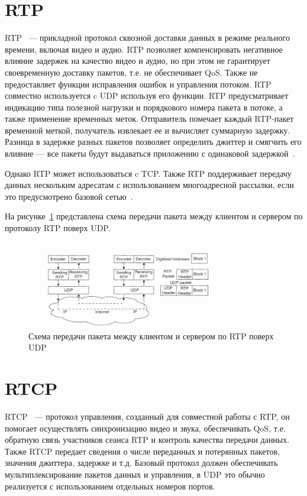 \section{RTP}

RTP~\cite{rtp_rtcp_overview} --- прикладной протокол сквозной доставки данных в режиме реального времени, включая видео и аудио.
RTP  позволяет компенсировать негативное влияние задержек на качество видео и аудио, но при этом не гарантирует своевременную доставку пакетов, т.е. не обеспечивает QoS. Также не предоставляет функции исправления ошибок и управления потоком.
RTP совместно используется c UDP используя его функции. 
RTP предусматривает индикацию типа полезной нагрузки
и порядкового номера пакета в потоке, а также применение временных
меток. Отправитель помечает каждый RTP-пакет временной меткой,
получатель извлекает ее и вычисляет суммарную задержку. Разница в
задержке разных пакетов позволяет определить джиттер и смягчить его
влияние --- все пакеты будут выдаваться приложению с одинаковой
задержкой~\cite{rtp_rtcp_overview, rtp_rtcp_ip_telefone, rtp_rtcp_rtsp_mc}.

Однако RTP может использоваться c TCP. 
Также RTP поддерживает передачу данных нескольким адресатам с использованием многоадресной рассылки, если это предусмотрено базовой сетью~\cite{rtp_rtcp_overview}.

На рисунке~\ref{pr:rtp_udp} представлена схема передачи пакета между клиентом и сервером по протоколу RTP поверх UDP.

\begin{figure}[h]
	\centering
	\includegraphics[width=0.8\textwidth]{img/rtp_over_udp.png}
	\caption{Схема  передачи пакета между клиентом и сервером по RTP поверх UDP~\cite{rtp_rtcp_rtsp_mc}}
	\label{pr:rtp_udp}
\end{figure}

\section{RTCP}

RTCP~\cite{rtp_rtcp_overview} --- протокол управления, созданный для совместной работы с RTP, он помогает осуществлять синхронизацию видео и звука, обеспечивать QoS, т.е. обратную связь участников сеанса RTP и контроль качества передачи данных. Также RTCP передает сведения о числе переданных и потерянных пакетов, значения джиттера, задержке и т.д.
Базовый протокол должен обеспечивать мультиплексирование пакетов данных и управления, в UDP это обычно реализуется с использованием отдельных номеров портов.


